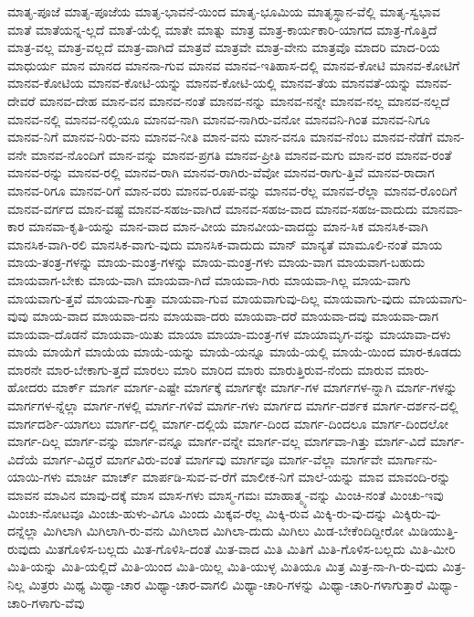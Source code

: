 {ಮಾತೃ-ಪೂಜೆ
ಮಾತೃ-ಪೂಜೆಯ
ಮಾತೃ-ಭಾವನೆ-ಯಿಂದ
ಮಾತೃ-ಭೂಮಿಯ
ಮಾತೃಸ್ಥಾನ-ವೆಲ್ಲಿ
ಮಾತೃ-ಸ್ವಭಾವ
ಮಾತೆ
ಮಾತೆಯನ್ನ-ಲ್ಲದೆ
ಮಾತೆ-ಯೆಲ್ಲಿ
ಮಾತೇ
ಮಾತ್ನು
ಮಾತ್ರ
ಮಾತ್ರ-ಕಾರ್ಯಕಾರಿ-ಯಾಗದ
ಮಾತ್ರ-ಗೊತ್ತಿದೆ
ಮಾತ್ರ-ವಲ್ಲ
ಮಾತ್ರ-ವಲ್ಲದೆ
ಮಾತ್ರ-ವಾಗಿದೆ
ಮಾತ್ರವೆ
ಮಾತ್ರವೇ
ಮಾತ್ರ-ವೇನು
ಮಾತ್ರವೊ
ಮಾದರಿ
ಮಾದ-ರಿಯ
ಮಾಧುರ್ಯ
ಮಾನ
ಮಾನದ
ಮಾನನಾ-ಗುವ
ಮಾನವ
ಮಾನವ-ಇತಿಹಾಸ-ದಲ್ಲಿ
ಮಾನವ-ಕೋಟಿ
ಮಾನವ-ಕೋಟಿಗೆ
ಮಾನವ-ಕೋಟಿಯ
ಮಾನವ-ಕೋಟಿ-ಯನ್ನು
ಮಾನವ-ಕೋಟಿ-ಯಲ್ಲಿ
ಮಾನವ-ತೆಯ
ಮಾನವತೆ-ಯನ್ನು
ಮಾನವ-ದೇವರೆ
ಮಾನವ-ದೇಹ
ಮಾನ-ವನ
ಮಾನವ-ನಂತೆ
ಮಾನವ-ನನ್ನು
ಮಾನವ-ನನ್ನೇ
ಮಾನವ-ನಲ್ಲ
ಮಾನವ-ನಲ್ಲದೆ
ಮಾನವ-ನಲ್ಲಿ
ಮಾನವ-ನಲ್ಲಿಯೂ
ಮಾನವ-ನಾಗಿ
ಮಾನವ-ನಾಗಿರು-ವನೋ
ಮಾನವನಿ-ಗಿಂತ
ಮಾನವ-ನಿಗೂ
ಮಾನವ-ನಿಗೆ
ಮಾನವ-ನಿರು-ವನು
ಮಾನವ-ನೀತಿ
ಮಾನ-ವನು
ಮಾನ-ವನೂ
ಮಾನವ-ನೆಂಬ
ಮಾನವ-ನೆಡೆಗೆ
ಮಾನ-ವನೇ
ಮಾನವ-ನೊಂದಿಗೆ
ಮಾನ-ವನ್ನು
ಮಾನವ-ಪ್ರಗತಿ
ಮಾನವ-ಪ್ರೀತಿ
ಮಾನವ-ಮಗು
ಮಾನ-ವರ
ಮಾನವ-ರಂತೆ
ಮಾನವ-ರನ್ನು
ಮಾನವ-ರಲ್ಲಿ
ಮಾನವ-ರಾಗಿ
ಮಾನವ-ರಾಗಿರು-ವೆವೋ
ಮಾನವ-ರಾಗು-ತ್ತಿವೆ
ಮಾನವ-ರಾದಾಗ
ಮಾನವ-ರಿಗೂ
ಮಾನವ-ರಿಗೆ
ಮಾನ-ವರು
ಮಾನವ-ರೂಪ-ವನ್ನು
ಮಾನವ-ರೆಲ್ಲ
ಮಾನವ-ರೆಲ್ಲಾ
ಮಾನವ-ರೊಂದಿಗೆ
ಮಾನವ-ವರ್ಗದ
ಮಾನ-ವಷ್ಟೆ
ಮಾನವ-ಸಹಜ-ವಾಗಿದೆ
ಮಾನವ-ಸಹಜ-ವಾದ
ಮಾನವ-ಸಹಜ-ವಾದುದು
ಮಾನವಾ-ಕಾರ
ಮಾನವಾ-ಕೃತಿ-ಯನ್ನು
ಮಾನ-ವಾದ
ಮಾನ-ವೀಯ
ಮಾನವೀಯ-ವಾದದ್ದು
ಮಾನ-ಸಿಕ
ಮಾನಸಿಕ-ವಾಗಿ
ಮಾನಸಿಕ-ವಾಗಿ-ರಲಿ
ಮಾನಸಿಕ-ವಾಗು-ವುದು
ಮಾನಸಿಕ-ವಾದುದು
ಮಾನ್
ಮಾನ್ಯತೆ
ಮಾಮೂಲಿ-ನಂತೆ
ಮಾಯ
ಮಾಯ-ತಂತ್ರ-ಗಳನ್ನು
ಮಾಯ-ಮಂತ್ರ-ಗಳನ್ನು
ಮಾಯ-ಮಂತ್ರ-ಗಳು
ಮಾಯ-ವಾಗ
ಮಾಯವಾಗ-ಬಹುದು
ಮಾಯವಾಗ-ಬೇಕು
ಮಾಯ-ವಾಗಿ
ಮಾಯವಾ-ಗಿದೆ
ಮಾಯವಾ-ಗಿರು
ಮಾಯವಾ-ಗಿಲ್ಲ
ಮಾಯ-ವಾಗು
ಮಾಯವಾಗು-ತ್ತವೆ
ಮಾಯವಾ-ಗುತ್ತಾ
ಮಾಯವಾ-ಗುವ
ಮಾಯವಾಗುವು-ದಿಲ್ಲ
ಮಾಯವಾಗು-ವುದು
ಮಾಯವಾಗು-ವುವು
ಮಾಯ-ವಾದ
ಮಾಯವಾ-ದನು
ಮಾಯವಾ-ದರು
ಮಾಯವಾ-ದರೆ
ಮಾಯವಾ-ದವು
ಮಾಯವಾ-ದಾಗ
ಮಾಯವಾ-ದೊಡನೆ
ಮಾಯವಾ-ಯಿತು
ಮಾಯಾ
ಮಾಯಾ-ಮಂತ್ರ-ಗಳ
ಮಾಯಾಮೃಗ-ವನ್ನು
ಮಾಯಾವಾ-ದಳು
ಮಾಯೆ
ಮಾಯೆಗೆ
ಮಾಯೆಯ
ಮಾಯೆ-ಯನ್ನು
ಮಾಯೆ-ಯನ್ನೂ
ಮಾಯೆ-ಯಲ್ಲಿ
ಮಾಯೆ-ಯಿಂದ
ಮಾರ-ಕೂಡದು
ಮಾರನೇ
ಮಾರ-ಬೇಕಾಗು-ತ್ತದೆ
ಮಾರಲು
ಮಾರಿ
ಮಾರಿದ
ಮಾರು
ಮಾರುತ್ತಿರುವ-ನೆಂದು
ಮಾರುವ
ಮಾರು-ಹೋದರು
ಮಾರ್ಕ್
ಮಾರ್ಗ
ಮಾರ್ಗ-ಎಷ್ಟೇ
ಮಾರ್ಗಕ್ಕೆ
ಮಾರ್ಗಕ್ಕೇ
ಮಾರ್ಗ-ಗಳ
ಮಾರ್ಗಗಳ-ನ್ನಾಗಿ
ಮಾರ್ಗ-ಗಳನ್ನು
ಮಾರ್ಗಗಳ-ನ್ನೆಲ್ಲಾ
ಮಾರ್ಗ-ಗಳಲ್ಲಿ
ಮಾರ್ಗ-ಗಳಿವೆ
ಮಾರ್ಗ-ಗಳು
ಮಾರ್ಗದ
ಮಾರ್ಗ-ದರ್ಶಕ
ಮಾರ್ಗ-ದರ್ಶನ-ದಲ್ಲಿ
ಮಾರ್ಗದರ್ಶಿ-ಯಾಗಲು
ಮಾರ್ಗ-ದಲ್ಲಿ
ಮಾರ್ಗ-ದಲ್ಲಿಯೆ
ಮಾರ್ಗ-ದಿಂದ
ಮಾರ್ಗ-ದಿಂದಲೂ
ಮಾರ್ಗ-ದಿಂದಲೋ
ಮಾರ್ಗ-ದಿಲ್ಲ
ಮಾರ್ಗ-ವನ್ನು
ಮಾರ್ಗ-ವನ್ನೂ
ಮಾರ್ಗ-ವನ್ನೇ
ಮಾರ್ಗ-ವಲ್ಲ
ಮಾರ್ಗವಾ-ಗಿತ್ತು
ಮಾರ್ಗ-ವಿದೆ
ಮಾರ್ಗ-ವಿದೆಯೆ
ಮಾರ್ಗ-ವಿದ್ದರೆ
ಮಾರ್ಗವಿರು-ವಂತೆ
ಮಾರ್ಗವು
ಮಾರ್ಗವೂ
ಮಾರ್ಗ-ವೆಲ್ಲಾ
ಮಾರ್ಗವೇ
ಮಾರ್ಗಾನು-ಯಾಯಿ-ಗಳು
ಮಾರ್ಚಿ
ಮಾರ್ಚ್
ಮಾರ್ಪಡಿ-ಸುವ-ವ-ರೆಗೆ
ಮಾಲೀಕ-ನಿಗೆ
ಮಾಲೆ-ಯನ್ನು
ಮಾವ
ಮಾವಂದಿ-ರನ್ನು
ಮಾವನ
ಮಾವಿನ
ಮಾವು-ದಕ್ಕೆ
ಮಾಸ
ಮಾಸ-ಗಳು
ಮಾಸ್ಮ-ಗಮಃ
ಮಾಹಾತ್ಮ್ಯ-ವನ್ನು
ಮಿಂಚಿ-ನಂತೆ
ಮಿಂಚು-ಇವು
ಮಿಂಚು-ನೋಟವೂ
ಮಿಂಚು-ಹುಳು-ವಿಗೂ
ಮಿಂದು
ಮಿಕ್ಕವ-ರೆಲ್ಲ
ಮಿಕ್ಕಿ-ರುವ
ಮಿಕ್ಕಿ-ರು-ವು-ದನ್ನು
ಮಿಕ್ಕಿರು-ವು-ದನ್ನೆಲ್ಲಾ
ಮಿಗಿಲಾಗಿ
ಮಿಗಿಲಾಗಿ-ರು-ವನು
ಮಿಗಿಲಾದ
ಮಿಗಿಲಾ-ದುದು
ಮಿಗಿಲು
ಮಿಡ-ಬೇಕೆಂದಿದ್ದೀರೋ
ಮಿಡಿಯುತ್ತಿ-ರುವುದು
ಮಿತಗೊಳಿಸ-ಬಲ್ಲದು
ಮಿತ-ಗೊಳಿಸಿ-ದಂತೆ
ಮಿತ-ವಾದ
ಮಿತಿ
ಮಿತಿಗೆ
ಮಿತಿ-ಗೊಳಿಸ-ಬಲ್ಲದು
ಮಿತಿ-ಮೀರಿ
ಮಿತಿ-ಯನ್ನು
ಮಿತಿ-ಯಲ್ಲಿದೆ
ಮಿತಿ-ಯಿಂದ
ಮಿತಿ-ಯಿಲ್ಲ
ಮಿತಿ-ಯುಳ್ಳ
ಮಿತಿಯೂ
ಮಿತ್ರ
ಮಿತ್ರ-ನಾ-ಗಿ-ರು-ವುದು
ಮಿತ್ರ-ನಿಲ್ಲ
ಮಿತ್ರರು
ಮಿಥ್ಯ
ಮಿಥ್ಯಾ-ಚಾರ
ಮಿಥ್ಯಾ-ಚಾರ-ವಾಗಲಿ
ಮಿಥ್ಯಾ-ಚಾರಿ-ಗಳನ್ನು
ಮಿಥ್ಯಾ-ಚಾರಿ-ಗಳಾಗುತ್ತಾರೆ
ಮಿಥ್ಯಾ-ಚಾರಿ-ಗಳಾಗು-ವೆವು
}
